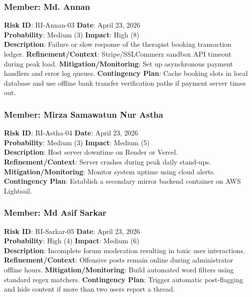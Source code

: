\documentclass[a4paper,11pt]{report}
\begin{document}
\subsubsection{Member: Md. Annan}
\textbf{Risk ID}: RI-Annan-03 \hfill \textbf{Date}: April 23, 2026\\
\textbf{Probability}: Medium (3) \hfill \textbf{Impact}: High (8) \\
\textbf{Description}: Failure or slow response of the therapist booking transaction ledger.
\textbf{Refinement/Context}: Stripe/SSLCommerz sandbox API timeout during peak load.
\textbf{Mitigation/Monitoring}: Set up asynchronous payment handlers and error log queues.
\textbf{Contingency Plan}: Cache booking slots in local database and use offline bank transfer verification paths if payment server times out.

\subsubsection{Member: Mirza Samawatun Nur Astha}
\textbf{Risk ID}: RI-Astha-04 \hfill \textbf{Date}: April 23, 2026\\
\textbf{Probability}: Medium (3) \hfill \textbf{Impact}: Medium (5) \\
\textbf{Description}: Host server downtime on Render or Vercel.
\textbf{Refinement/Context}: Server crashes during peak daily stand-ups.
\textbf{Mitigation/Monitoring}: Monitor system uptime using cloud alerts.
\textbf{Contingency Plan}: Establish a secondary mirror backend container on AWS Lightsail.

\subsubsection{Member: Md Asif Sarkar}
\textbf{Risk ID}: RI-Sarkar-05 \hfill \textbf{Date}: April 23, 2026\\
\textbf{Probability}: High (4) \hfill \textbf{Impact}: Medium (6) \\
\textbf{Description}: Incomplete forum moderation resulting in toxic user interactions.
\textbf{Refinement/Context}: Offensive posts remain online during administrator offline hours.
\textbf{Mitigation/Monitoring}: Build automated word filters using standard regex matchers.
\textbf{Contingency Plan}: Trigger automatic post-flagging and hide content if more than two users report a thread.
\end{document}
